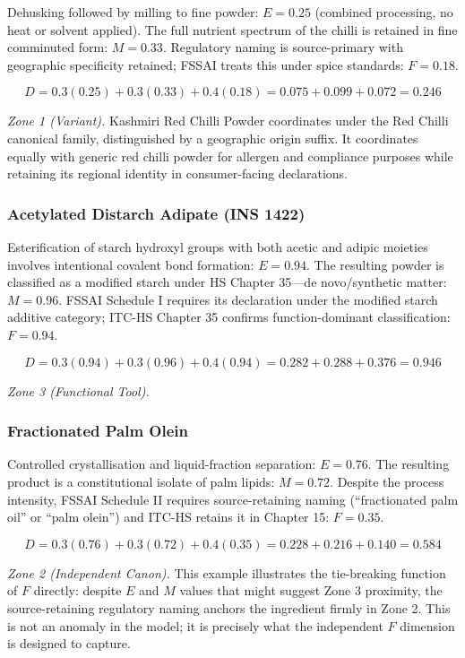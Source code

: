 \documentclass[12pt,a3paper]{article}
\begin{document}
Dehusking followed by milling to fine powder: $E = 0.25$ (combined processing, no heat or solvent applied). The full nutrient spectrum of the chilli is retained in fine comminuted form: $M = 0.33$. Regulatory naming is source-primary with geographic specificity retained; FSSAI treats this under spice standards: $F = 0.18$.

$$D = 0.3(0.25) + 0.3(0.33) + 0.4(0.18) = 0.075 + 0.099 + 0.072 = \mathbf{0.246}$$

\textit{Zone 1 (Variant).} Kashmiri Red Chilli Powder coordinates under the Red Chilli canonical family, distinguished by a geographic origin suffix. It coordinates equally with generic red chilli powder for allergen and compliance purposes while retaining its regional identity in consumer-facing declarations.

\subsubsection{Acetylated Distarch Adipate (INS 1422)}

Esterification of starch hydroxyl groups with both acetic and adipic moieties involves intentional covalent bond formation: $E = 0.94$. The resulting powder is classified as a modified starch under HS Chapter 35---de novo/synthetic matter: $M = 0.96$. FSSAI Schedule I requires its declaration under the modified starch additive category; ITC-HS Chapter 35 confirms function-dominant classification: $F = 0.94$.

$$D = 0.3(0.94) + 0.3(0.96) + 0.4(0.94) = 0.282 + 0.288 + 0.376 = \mathbf{0.946}$$

\textit{Zone 3 (Functional Tool).}

\subsubsection{Fractionated Palm Olein}

Controlled crystallisation and liquid-fraction separation: $E = 0.76$. The resulting product is a constitutional isolate of palm lipids: $M = 0.72$. Despite the process intensity, FSSAI Schedule II requires source-retaining naming (``fractionated palm oil'' or ``palm olein'') and ITC-HS retains it in Chapter 15: $F = 0.35$.

$$D = 0.3(0.76) + 0.3(0.72) + 0.4(0.35) = 0.228 + 0.216 + 0.140 = \mathbf{0.584}$$

\textit{Zone 2 (Independent Canon).} This example illustrates the tie-breaking function of $F$ directly: despite $E$ and $M$ values that might suggest Zone 3 proximity, the source-retaining regulatory naming anchors the ingredient firmly in Zone 2. This is not an anomaly in the model; it is precisely what the independent $F$ dimension is designed to capture.
\end{document}
